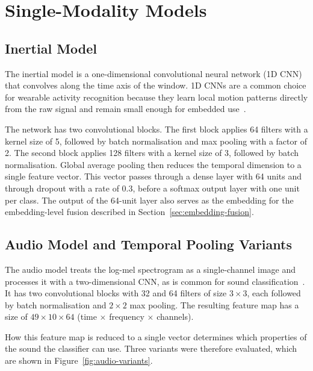 \section{Single-Modality Models}
\label{sec:single}

\subsection{Inertial Model}
\label{sec:imu-model}

The inertial model is a one-dimensional convolutional neural network (1D CNN)
that convolves along the time axis of the window. 1D CNNs are a common choice for
wearable activity recognition because they learn local motion patterns directly
from the raw signal and remain small enough for embedded
use~\cite{tao2018worker, alamin2019action, zhou2025efficient}.

The network has two convolutional blocks. The first block applies 64 filters with
a kernel size of 5, followed by batch normalisation and max pooling with a factor
of 2. The second block applies 128 filters with a kernel size of 3, followed by
batch normalisation. Global average pooling then reduces the temporal dimension
to a single feature vector. This vector passes through a dense layer with 64
units and through dropout with a rate of 0.3, before a softmax output layer with
one unit per class. The output of the 64-unit layer also serves as the embedding
for the embedding-level fusion described in Section~\ref{sec:embedding-fusion}.

\subsection{Audio Model and Temporal Pooling Variants}
\label{sec:audio-model}

The audio model treats the log-mel spectrogram as a single-channel image and
processes it with a two-dimensional CNN, as is common for sound
classification~\cite{koch2024recognition}. It has two convolutional
blocks with 32 and 64 filters of size $3 \times 3$, each followed by batch
normalisation and $2 \times 2$ max pooling. The resulting feature map has a size
of $49 \times 10 \times 64$ (time $\times$ frequency $\times$ channels).

How this feature map is reduced to a single vector determines which properties of
the sound the classifier can use. Three variants were therefore evaluated, which
are shown in Figure~\ref{fig:audio-variants}.

